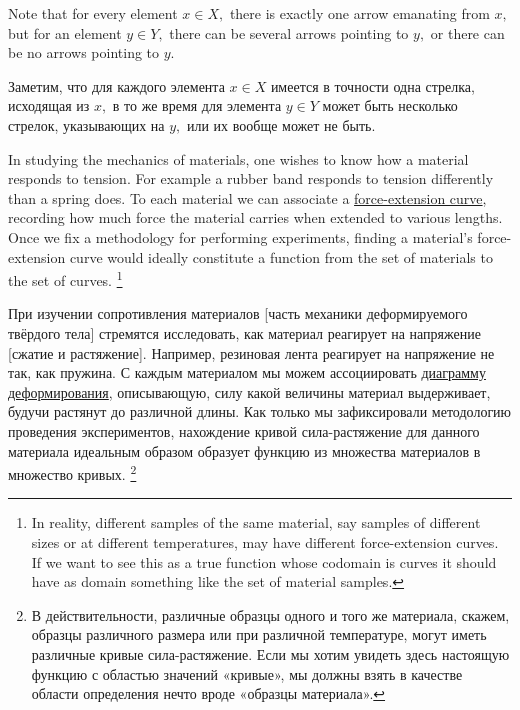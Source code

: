 \documentclass[../main/CT4S-EN-RU]{subfiles}
\begin{document}
\begin{blockENG}
Note that for every element $x\in X,$ there is exactly one arrow emanating from $x,$ but for an element $y\in Y,$ there can be several arrows pointing to $y,$ or there can be no arrows pointing to $y.$ 
\end{blockENG}

\begin{blockRUS}
Заметим, что для каждого элемента $x\in X$ имеется в точности одна стрелка, исходящая из $x,$ в то же время для элемента $y\in Y$ может быть несколько стрелок, указывающих на $y,$ или их вообще может не быть.
\end{blockRUS}

\begin{applicationENG}\label{app:force-extension}
In studying the mechanics of materials, one wishes to know how a material responds to tension. For example a rubber band responds to tension differently than a spring does. To each material we can associate a \href{http://en.wikipedia.org/wiki/Stress–strain_curve}{\text force-extension curve}, recording how much force the material carries when extended to various lengths. Once we fix a methodology for performing experiments, finding a material's force-extension curve would ideally constitute a function from the set of materials to the set of curves.%
\footnote{In reality, different samples of the same material, say samples of different sizes or at different temperatures, may have different force-extension curves. If we want to see this as a true function whose codomain is curves it should have as domain something like the set of material samples.}
\end{applicationENG}

\begin{applicationRUS}\label{app:force-extension}
При изучении сопротивления материалов [часть механики деформируемого твёрдого тела] стремятся исследовать, как материал реагирует на напряжение [сжатие и растяжение]. Например, резиновая лента реагирует на напряжение не так, как пружина. С каждым материалом мы можем ассоциировать \href{https://ru.wikipedia.org/wiki/%D0%94%D0%B8%D0%B0%D0%B3%D1%80%D0%B0%D0%BC%D0%BC%D0%B0_%D0%B4%D0%B5%D1%84%D0%BE%D1%80%D0%BC%D0%B8%D1%80%D0%BE%D0%B2%D0%B0%D0%BD%D0%B8%D1%8F}{\text диаграмму деформирования}, описывающую, силу какой величины материал выдерживает, будучи растянут до различной длины. Как только мы зафиксировали методологию проведения экспериментов, нахождение кривой сила-растяжение для данного материала идеальным образом образует функцию из множества материалов в множество кривых.%
\footnote{В действительности, различные образцы одного и того же материала, скажем, образцы различного размера или при различной температуре, могут иметь различные кривые сила-растяжение. Если мы хотим увидеть здесь настоящую функцию с областью значений «кривые», мы должны взять в качестве области определения нечто вроде «образцы материала».} 
\end{applicationRUS}
\end{document}
